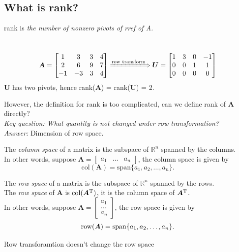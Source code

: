 \subsection{What is rank?}
rank is \textit{the number of nonzero pivots of rref of A.}
\begin{example}\qquad\\
\[
\bm A = \begin{bmatrix}
1&3&3&4\\2&6&9&7\\-1&-3&3&4
\end{bmatrix}
\xLongrightarrow{\text{row transform}}
\bm U = \begin{bmatrix}
1&3&0&-1\\0&0&1&1\\0&0&0&0
\end{bmatrix}
\]
$\bm U$ has two pivots, hence rank($\bm A$) = rank($\bm U$) = 2.
\end{example}
However, the definition for rank is too complicated, can we define rank of $\bm A$ directly?\\
\emph{Key question: What quantity is not changed under row transformation?}\\
\textit{Answer: }Dimension of row space.
\begin{definition}
The \emph{column space} of a matrix is the subspace of $\mathbb{R}^{n}$ spanned by the columns.\\
In other words, suppose $\bm A = \left[\begin{array}{c|c|c}
a_1&\dots&a_n
\end{array}\right]$, the column space is given by
\[
\text{col}(\bm A) = \text{span}\{a_1,a_2,\dots,a_n\}.
\]
\end{definition}
\begin{definition}
The \emph{row space} of a matrix is the subspace of $\mathbb{R}^{n}$ spanned by the rows.\\
The \emph{row space} of $\bm A$ is $\text{col}(\bm A^{\mathrm T})$, it is the column space of $\bm A^{\mathrm T}$.\\
In other words, suppose $\bm A = \left[\begin{array}{c}
a_1\\
\hline
\dots\\
\hline
a_n
\end{array}\right]$, the row space is given by
\[
\operatorname{row}(\bm A) = \operatorname{span}\{a_1,a_2,\dots,a_n\}.
\]
\end{definition}
\begin{proposition}\label{row_transformation}
Row transforamtion doesn't change the row space
\end{proposition}
